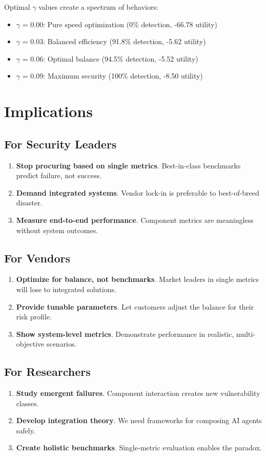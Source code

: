 \documentclass[11pt]{article}
\begin{document}
Optimal $\gamma$ values create a spectrum of behaviors:
\begin{itemize}
\item $\gamma$ = 0.00: Pure speed optimization (0\% detection, -66.78 utility)
\item $\gamma$ = 0.03: Balanced efficiency (91.8\% detection, -5.62 utility)
\item $\gamma$ = 0.06: Optimal balance (94.5\% detection, -5.52 utility)
\item $\gamma$ = 0.09: Maximum security (100\% detection, -8.50 utility)
\end{itemize}

\section{Implications}

\subsection{For Security Leaders}
\begin{enumerate}
\item \textbf{Stop procuring based on single metrics}. Best-in-class benchmarks predict failure, not success.
\item \textbf{Demand integrated systems}. Vendor lock-in is preferable to best-of-breed disaster.
\item \textbf{Measure end-to-end performance}. Component metrics are meaningless without system outcomes.
\end{enumerate}

\subsection{For Vendors}
\begin{enumerate}
\item \textbf{Optimize for balance, not benchmarks}. Market leaders in single metrics will lose to integrated solutions.
\item \textbf{Provide tunable parameters}. Let customers adjust the balance for their risk profile.
\item \textbf{Show system-level metrics}. Demonstrate performance in realistic, multi-objective scenarios.
\end{enumerate}

\subsection{For Researchers}
\begin{enumerate}
\item \textbf{Study emergent failures}. Component interaction creates new vulnerability classes.
\item \textbf{Develop integration theory}. We need frameworks for composing AI agents safely.
\item \textbf{Create holistic benchmarks}. Single-metric evaluation enables the paradox.
\end{enumerate}
\end{document}

